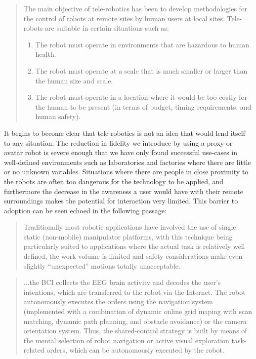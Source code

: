 \documentclass[a4paper,12pt]{report}
\begin{document}
\begin{quote}

The main objective of tele-robotics has been to develop methodologies for the control of robots at remote sites by human users at local sites. Tele-robots are suitable in certain situations such as:
\begin{enumerate}
\item The robot must operate in environments that are hazardous to human health.
\item The robot must operate at a scale that is much smaller or larger than the human size and scale.
\item The robot must operate in a location where it would be too costly for the human to be present (in terms of budget, timing requirements, and human safety).
\end{enumerate}
	\begin{flushright}
		\cite{726589}
	\end{flushright}
\end{quote}

It begins to become clear that tele-robotics is not an idea that would lend itself to any situation. The reduction in fidelity we introduce by using a proxy or avatar robot is severe enough that we have only found successful use-cases in well-defined environments such as laboratories and factories where there are little or no unknown variables. Situations where there are people in close proximity to the robots are often too dangerous for the technology to be applied, and furthermore the decrease in the awareness a user would have with their remote surroundings makes the potential for interaction very limited. This barrier to adoption can be seen echoed in the following passage:

\begin{quote}
	Traditionally most robotic applications have involved the use of single static (non-mobile) manipulator platforms, with this technique being particularly suited to applications where the actual task is relatively well defined, the work volume is limited and safety considerations make even slightly “unexpected” motions totally unacceptable.
	\begin{flushright}
		\cite{540147}
	\end{flushright}
\end{quote}



\begin{quotation}{
	...the BCI collects the EEG brain activity and decodes the user's intentions, which are transferred to the robot via the Internet. The robot autonomously executes the orders using the navigation system (implemented with a combination of dynamic online grid maping with scan matching, dynamic path planning, and obstacle avoidance) or the camera orientation system. Thus, the shared-control strategy is built by means  of the mental selection of robot navigation or active visual exploration task-related orders, which can be autonomously executed by the robot.}
	\begin{flushright}
		\cite{6104414}
	\end{flushright}
\end{quotation}
\end{document}
